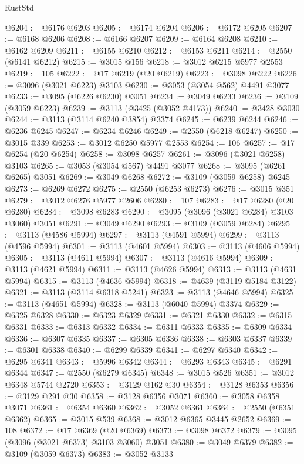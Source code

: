 \begin{lexlean}{RustStd}
\begin{coremodule}
@6204 := @6176 @6203
@6205 := @6174 @6204
@6206 := @6172 @6205
@6207 := @6168 @6206
@6208 := @6166 @6207
@6209 := @6164 @6208
@6210 := @6162 @6209
@6211 := @6155 @6210
@6212 := @6153 @6211
@6214 := @2550 (@6141 @6212)
@6215 := @3015 @156
@6218 := @3012 @6215 @5977 @2553
@6219 := 105
@6222 := @17 @6219 (@20 @6219)
@6223 := @3098 @6222
@6226 := @3096 (@3021 @6223) @3103
@6230 := @3053 (@3054 @562) @4491 @3077
@6233 := @3095 (@6226 @6230) @3051
@6234 := @3049 @6233
@6236 := @3109 (@3059 @6223)
@6239 := @3113 (@3425 (@3052 @4173))
@6240 := @3428 @3030
@6244 := @3113 (@3114 @6240 @3854) @3374
@6245 := @6239 @6244
@6246 := @6236 @6245
@6247 := @6234 @6246
@6249 := @2550 (@6218 @6247)
@6250 := @3015 @339
@6253 := @3012 @6250 @5977 @2553
@6254 := 106
@6257 := @17 @6254 (@20 @6254)
@6258 := @3098 @6257
@6261 := @3096 (@3021 @6258) @3103
@6265 := @3053 (@3054 @567) @4491 @3077
@6268 := @3095 (@6261 @6265) @3051
@6269 := @3049 @6268
@6272 := @3109 (@3059 @6258) @6245
@6273 := @6269 @6272
@6275 := @2550 (@6253 @6273)
@6276 := @3015 @351
@6279 := @3012 @6276 @5977 @2606
@6280 := 107
@6283 := @17 @6280 (@20 @6280)
@6284 := @3098 @6283
@6290 := @3095 (@3096 (@3021 @6284) @3103 @3060) @3051
@6291 := @3049 @6290
@6293 := @3109 (@3059 @6284)
@6295 := @3113 (@4586 @5994)
@6297 := @3113 (@4591 @5994)
@6299 := @3113 (@4596 @5994)
@6301 := @3113 (@4601 @5994)
@6303 := @3113 (@4606 @5994)
@6305 := @3113 (@4611 @5994)
@6307 := @3113 (@4616 @5994)
@6309 := @3113 (@4621 @5994)
@6311 := @3113 (@4626 @5994)
@6313 := @3113 (@4631 @5994)
@6315 := @3113 (@4636 @5994)
@6318 := @4639 (@3119 @5184 @3122)
@6321 := @3113 (@3114 @6318 @5241)
@6323 := @3113 (@4646 @5994)
@6325 := @3113 (@4651 @5994)
@6328 := @3113 (@6040 @5994) @3374
@6329 := @6325 @6328
@6330 := @6323 @6329
@6331 := @6321 @6330
@6332 := @6315 @6331
@6333 := @6313 @6332
@6334 := @6311 @6333
@6335 := @6309 @6334
@6336 := @6307 @6335
@6337 := @6305 @6336
@6338 := @6303 @6337
@6339 := @6301 @6338
@6340 := @6299 @6339
@6341 := @6297 @6340
@6342 := @6295 @6341
@6343 := @5996 @6342
@6344 := @6293 @6343
@6345 := @6291 @6344
@6347 := @2550 (@6279 @6345)
@6348 := @3015 @526
@6351 := @3012 @6348 @5744 @2720
@6353 := @3129 @162 @30
@6354 := @3128 @6353
@6356 := @3129 @291 @30
@6358 := @3128 @6356 @3071
@6360 := @3058 @6358 @3071
@6361 := @6354 @6360
@6362 := @3052 @6361
@6364 := @2550 (@6351 @6362)
@6365 := @3015 @539
@6368 := @3012 @6365 @3445 @2652
@6369 := 108
@6372 := @17 @6369 (@20 @6369)
@6373 := @3098 @6372
@6379 := @3095 (@3096 (@3021 @6373) @3103 @3060) @3051
@6380 := @3049 @6379
@6382 := @3109 (@3059 @6373)
@6383 := @3052 @3133

\end{coremodule}
\end{lexlean}
